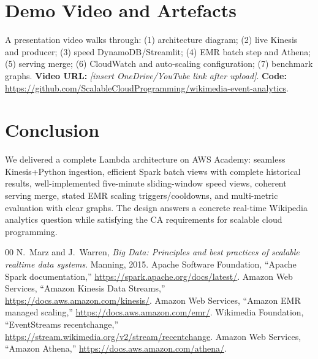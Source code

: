 \documentclass[conference]{IEEEtran}
\begin{document}
\section{Demo Video and Artefacts}
A presentation video walks through: (1) architecture diagram; (2) live Kinesis and producer; (3) speed DynamoDB/Streamlit; (4) EMR batch step and Athena; (5) serving merge; (6) CloudWatch and auto-scaling configuration; (7) benchmark graphs.  
\textbf{Video URL:} \textit{[insert OneDrive/YouTube link after upload]}.  
\textbf{Code:} \url{https://github.com/ScalableCloudProgramming/wikimedia-event-analytics}.

\section{Conclusion}
We delivered a complete Lambda architecture on AWS Academy: seamless Kinesis+Python ingestion, efficient Spark batch views with complete historical results, well-implemented five-minute sliding-window speed views, coherent serving merge, stated EMR scaling triggers/cooldowns, and multi-metric evaluation with clear graphs. The design answers a concrete real-time Wikipedia analytics question while satisfying the CA requirements for scalable cloud programming.

\begin{thebibliography}{00}
 N.~Marz and J.~Warren, \emph{Big Data: Principles and best practices of scalable realtime data systems}. Manning, 2015.
 Apache Software Foundation, ``Apache Spark documentation,'' \url{https://spark.apache.org/docs/latest/}.
 Amazon Web Services, ``Amazon Kinesis Data Streams,'' \url{https://docs.aws.amazon.com/kinesis/}.
 Amazon Web Services, ``Amazon EMR managed scaling,'' \url{https://docs.aws.amazon.com/emr/}.
 Wikimedia Foundation, ``EventStreams recentchange,'' \url{https://stream.wikimedia.org/v2/stream/recentchange}.
 Amazon Web Services, ``Amazon Athena,'' \url{https://docs.aws.amazon.com/athena/}.
\end{thebibliography}
\end{document}
